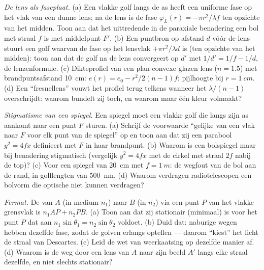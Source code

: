 \begin{exercise}[$\star\star$]\label{exo:b2:scalar-light-model:5}
\emph{De lens als faseplaat.} (a) Een vlakke golf langs de as heeft een
uniforme fase op het vlak van een dunne lens; na de lens is de fase
$\varphi_L(r) = -\pi r^2/\lambda f$ ten opzichte van het midden. Toon aan
dat het uittredende  in de paraxiale benadering een bol met straal
$f$ is met middelpunt $F'$. (b) Een puntbron op afstand $d$ vóór de lens
stuurt een golf waarvan de fase op het lensvlak $+\pi r^2/\lambda d$ is (ten
opzichte van het midden): toon aan dat de golf na de lens convergeert op
$d'$ met $1/d' = 1/f - 1/d$, de lenzenformule. (c) Dikteprofiel van een
plan-convexe glazen lens ($n = 1.5$) met brandpuntsafstand \qty{10}{cm}:
$e(r) =
e_0 - r^2/2(n - 1)f$; pijlhoogte bij $r = \qty{1}{cm}$. (d) Een
``fresnellens'' vouwt het profiel terug telkens wanneer het
$\lambda/(n - 1)$ overschrijdt: waarom bundelt zij toch, en waarom maar één
kleur volmaakt?
\end{exercise}

\begin{exercise}[$\star\star$]\label{exo:b2:scalar-light-model:6}
\emph{Stigmatisme van een spiegel.} Een spiegel moet een vlakke golf die
langs zijn as aankomt naar een punt $F$ sturen. (a) Schrijf de voorwaarde
``gelijke  van een vlak  naar $F$ voor elk punt
van de spiegel'' op en toon aan dat zij een parabool $y^2 = 4fx$ definieert
met $F$ in haar brandpunt. (b) Waarom is een bolspiegel maar bij benadering
stigmatisch (vergelijk $y^2 = 4fx$ met de cirkel met straal $2f$ nabij de
top)? (c) Voor een spiegel van \qty{20}{cm} met $f = \qty{1}{m}$: de wegfout
van de bol aan de rand, in golflengten van \qty{500}{nm}. (d) Waarom
verdragen radiotelescopen een bolvorm die optische niet kunnen verdragen?
\end{exercise}

\begin{exercise}[$\star\star$]\label{exo:b2:scalar-light-model:7}
\emph{Fermat.} De  van $A$ (in medium $n_1$) naar $B$ (in
$n_2$) via een punt $P$ van het vlakke grensvlak is $n_1AP + n_2PB$. (a)
Toon aan dat zij stationair (minimaal) is voor het punt $P$ dat aan
$n_1\sin\theta_1 = n_2\sin\theta_2$ voldoet. (b) Duid dat: naburige wegen
hebben dezelfde fase, zodat de golven erlangs optellen --- daarom ``kiest''
het licht de straal van Descartes. (c) Leid de wet van weerkaatsing op
dezelfde manier af. (d) Waarom is de weg door een lens van $A$ naar zijn
beeld $A'$ langs elke straal dezelfde, en niet slechts stationair?
\end{exercise}

